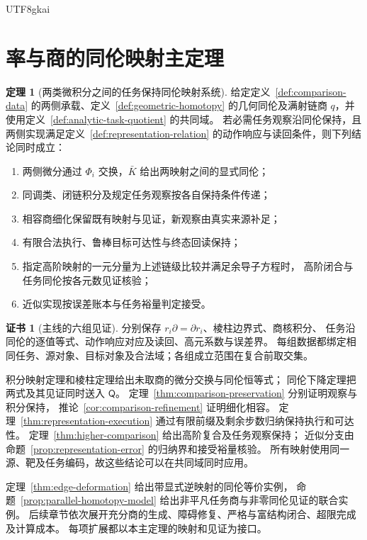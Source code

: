 \documentclass[12pt]{report}
\makeatletter
\theoremstyle{definition}
\newtheorem{theorem}{定理}[chapter]
\newtheorem{Certificate}{证书}[chapter]
\renewenvironment{proof}[1][\proofname]{\par
  \pushQED{\qed}\normalfont
  \topsep6\p@\@plus6\p@\relax
  \trivlist
  \item[\hskip\labelsep\normalfont #1\@addpunct{.}]\ignorespaces
}{
  \popQED\endtrivlist\@endpefalse
}
\makeatother
\begin{document}
\begin{CJK*}{UTF8}{gkai}
\section{率与商的同伦映射主定理}
\begin{theorem}[两类微积分之间的任务保持同伦映射系统]
\label{thm:comparison-main}
给定定义~\ref{def:comparison-data} 的两侧承载、定义~\ref{def:geometric-homotopy}
的几何同伦及满射链商 \(q\)，并使用定义~\ref{def:analytic-task-quotient} 的共同域。
若必需任务观察沿同伦保持，且两侧实现满足定义~\ref{def:representation-relation}
的动作响应与读回条件，则下列结论同时成立：
\begin{enumerate}
\item 两侧微分通过 \(\Phi_i\) 交换，\(\bar K\) 给出两映射之间的显式同伦；
\item 同调类、闭链积分及规定任务观察按各自保持条件传递；
\item 相容商细化保留既有映射与见证，新观察由真实来源补足；
\item 有限合法执行、鲁棒目标可达性与终态回读保持；
\item 指定高阶映射的一元分量为上述链级比较并满足余导子方程时，
高阶闭合与任务同伦按各元数见证核验；
\item 近似实现按误差账本与任务裕量判定接受。
\end{enumerate}
\end{theorem}
\begin{Certificate}[主线的六组见证]
分别保存 \(r_i\partial=\partial r_i\)、棱柱边界式、商核积分、
任务沿同伦的逐值等式、动作响应对应及读回、高元系数与误差界。
每组数据都绑定相同任务、源对象、目标对象及合法域；各组成立范围在复合前取交集。
\end{Certificate}
\begin{proof}
积分映射定理和棱柱定理给出未取商的微分交换与同伦恒等式；
同伦下降定理把两式及其见证同时送入 \(\mathsf Q\)。
定理~\ref{thm:comparison-preservation} 分别证明观察与积分保持，
推论~\ref{cor:comparison-refinement} 证明细化相容。
定理~\ref{thm:representation-execution} 通过有限前缀及剩余步数归纳保持执行和可达性。
定理~\ref{thm:higher-comparison} 给出高阶复合及任务观察保持；
近似分支由命题~\ref{prop:representation-error} 的归纳界和接受裕量核验。
所有映射使用同一源、靶及任务编码，故这些结论可以在共同域同时应用。
\end{proof}
定理~\ref{thm:edge-deformation} 给出带显式逆映射的同伦等价实例，
命题~\ref{prop:parallel-homotopy-model} 给出非平凡任务商与非零同伦见证的联合实例。
后续章节依次展开充分商的生成、障碍修复、严格与富结构闭合、超限完成及计算成本。
每项扩展都以本主定理的映射和见证为接口。


\end{CJK*}
\end{document}
